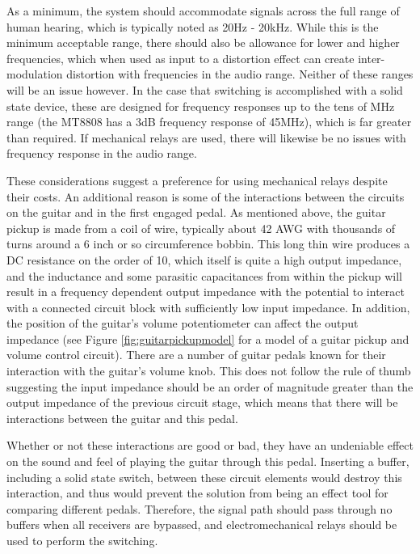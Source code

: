 		As a minimum, the system should accommodate signals across the full range of human hearing, which is typically noted as 20Hz - 20kHz. While this is the minimum acceptable range, there should also be allowance for lower and higher frequencies, which when used as input to a distortion effect can create inter-modulation distortion with frequencies in the audio range. Neither of these ranges will be an issue however. In the case that switching is accomplished with a solid state device, these are designed for frequency responses up to the tens of MHz range (the MT8808 has a 3dB frequency response of 45MHz), which is far greater than required. If mechanical relays are used, there will likewise be no issues with frequency response in the audio range.


		These considerations suggest a preference for using mechanical relays despite their costs. An additional reason is some of the interactions between the circuits on the guitar and in the first engaged pedal. As mentioned above, the guitar pickup is made from a coil of wire, typically about 42 AWG with thousands of turns around a 6 inch or so circumference bobbin. This long thin wire produces a DC resistance on the order of 10\kohm, which itself is quite a high output impedance, and the inductance and some parasitic capacitances from within the pickup will result in a frequency dependent output impedance with the potential to interact with a connected circuit block with sufficiently low input impedance. In addition, the position of the guitar’s volume potentiometer can affect the output impedance (see Figure \ref{fig:guitarpickupmodel} for a model of a guitar pickup and volume control circuit). There are a number of guitar pedals known for their interaction with the guitar’s volume knob.  This does not follow the rule of thumb suggesting the input impedance should be an order of magnitude greater than the output impedance of the previous circuit stage, which means that there will be interactions between the guitar and this pedal.

		Whether or not these interactions are good or bad, they have an undeniable effect on the sound and feel of playing the guitar through this pedal. Inserting a buffer, including a solid state switch, between these circuit elements would destroy this interaction, and thus would prevent the solution from being an effect tool for comparing different pedals. Therefore, the signal path should pass through no buffers when all receivers are bypassed, and electromechanical relays should be used to perform the switching.

